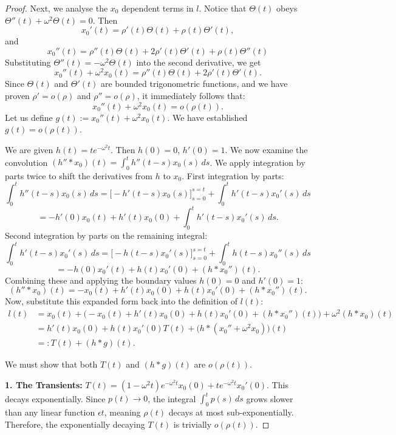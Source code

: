 \documentclass[10pt,a4paper]{amsart}
\begin{document}
\begin{proof}
Next, we analyse the $x_0$ dependent terms in $l$. 
			Notice that $\Theta(t)$ obeys $\Theta''(t) + \omega^2 \Theta(t) = 0$. Then 
			\[ x_0'(t) = \rho'(t)\Theta(t) + \rho(t)\Theta'(t), \]
			and 
			\[ x_0''(t) = \rho''(t)\Theta(t) + 2\rho'(t)\Theta'(t) + \rho(t)\Theta''(t) \]
			Substituting $\Theta''(t) = -\omega^2 \Theta(t)$ into the second derivative, we get 
			\[ x_0''(t) + \omega^2 x_0(t) = \rho''(t)\Theta(t) + 2\rho'(t)\Theta'(t). \]
			Since $\Theta(t)$ and $\Theta'(t)$ are bounded trigonometric functions, and we have proven $\rho' = o(\rho)$ and $\rho'' = o(\rho)$, it immediately follows that:
			\[ x_0''(t) + \omega^2 x_0(t) = o(\rho(t)). \]
			Let us define $g(t) := x_0''(t) + \omega^2 x_0(t)$. We have established $g(t) = o(\rho(t))$.
				
			We are given $h(t) = t e^{-\omega^2 t}$. Then $h(0)=0$, $h'(0)=1$. We now examine the convolution $(h'' * x_0)(t) = \int_0^t h''(t-s)x_0(s)\,ds$. We apply integration by parts twice to shift the derivatives from $h$ to $x_0$. 
			First integration by parts:
			\[ \int_0^t h''(t-s)x_0(s)\,ds = \Big[ -h'(t-s)x_0(s) \Big]_{s=0}^{s=t} + \int_0^t h'(t-s)x_0'(s)\,ds \]
			\[ = -h'(0)x_0(t) + h'(t)x_0(0) + \int_0^t h'(t-s)x_0'(s)\,ds. \]
			Second integration by parts on the remaining integral:
			\[ \int_0^t h'(t-s)x_0'(s)\,ds = \Big[ -h(t-s)x_0'(s) \Big]_{s=0}^{s=t} + \int_0^t h(t-s)x_0''(s)\,ds \]
			\[ = -h(0)x_0'(t) + h(t)x_0'(0) + (h * x_0'')(t). \]
			Combining these and applying the boundary values $h(0) = 0$ and $h'(0) = 1$:
			\[ (h'' * x_0)(t) = -x_0(t) + h'(t)x_0(0) + h(t)x_0'(0) + (h * x_0'')(t). \]
			Now, substitute this expanded form back into the definition of $l(t)$:
			\begin{align*}
				l(t) &= x_0(t) + \Big( -x_0(t) + h'(t)x_0(0) + h(t)x_0'(0) + (h * x_0'')(t) \Big) + \omega^2 (h * x_0)(t) \\
				&= h'(t)x_0(0) + h(t)x_0'(0)T(t) + \Big( h * (x_0'' + \omega^2 x_0) \Big)(t) \\
				&=: T(t) + (h * g)(t).
			\end{align*}
			
			We must show that both $T(t)$ and $(h * g)(t)$ are $o(\rho(t))$. 
			
			\textbf{1. The Transients:} 
			$T(t) = (1-\omega^2 t)e^{-\omega^2 t}x_0(0) + t e^{-\omega^2 t}x_0'(0)$. This decays exponentially. Since $p(t) \to 0$, the integral $\int_0^t p(s)\,ds$ grows slower than any linear function $\epsilon t$, meaning $\rho(t)$ decays at most sub-exponentially. Therefore, the exponentially decaying $T(t)$ is trivially $o(\rho(t))$.
			

\end{proof}
\end{document}
